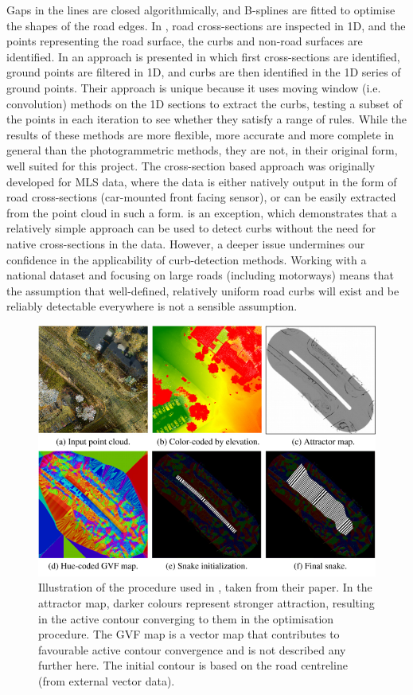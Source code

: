Gaps in the lines are closed algorithmically, and B-splines are fitted to optimise the shapes of the road edges. In \cite{zhang_2010}, road cross-sections are inspected in 1D, and the points representing the road surface, the curbs and non-road surfaces are identified. In \cite{yang_etal_2013} an approach is presented in which first cross-sections are identified, ground points are filtered in 1D, and curbs are then identified in the 1D series of ground points. Their approach is unique because it uses moving window (i.e. convolution) methods on the 1D sections to extract the curbs, testing a subset of the points in each iteration to see whether they satisfy a range of rules. While the results of these methods are more flexible, more accurate and more complete in general than the photogrammetric methods, they are not, in their original form, well suited for this project. The cross-section based approach was originally developed for MLS data, where the data is either natively output in the form of road cross-sections (car-mounted front facing sensor), or can be easily extracted from the point cloud in such a form. \cite{vosselman_zhou_2009} is an exception, which demonstrates that a relatively simple approach can be used to detect curbs without the need for native cross-sections in the data. However, a deeper issue undermines our confidence in the applicability of curb-detection methods. Working with a national dataset and focusing on large roads (including motorways) means that the assumption that well-defined, relatively uniform road curbs will exist and be reliably detectable everywhere is not a sensible assumption.

\begin{figure}[h]
    \centering
    \includegraphics[width=0.75\linewidth]{p2/figs/boyko_funkahuser_2011_01.png} 
    \caption{Illustration of the procedure used in \cite{boyko_funkhauser_2011}, taken from their paper. In the attractor map, darker colours represent stronger attraction, resulting in the active contour converging to them in the optimisation procedure. The GVF map is a vector map that contributes to favourable active contour convergence and is not described any further here. The initial contour is based on the road centreline (from external vector data).}
    \label{fig:activecontouroptimisation}
\end{figure}

